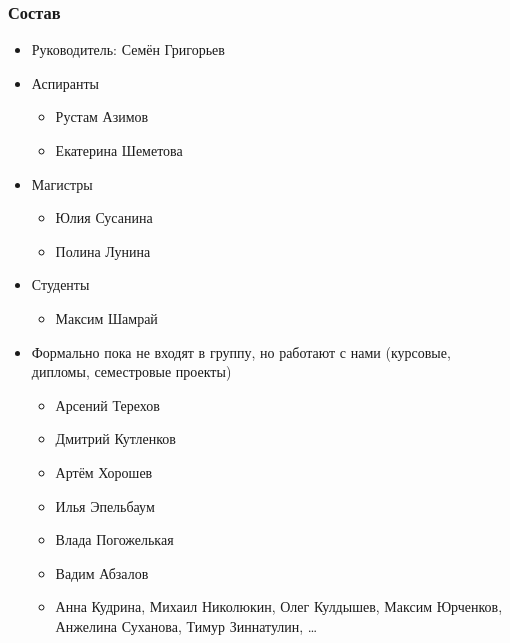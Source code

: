 \documentclass[xcolor=table]{beamer}
\begin{document}
\begin{frame}[fragile]

  \frametitle{Состав}
\begin{itemize}
      \item Руководитель: Семён Григорьев
      \item Аспиранты
      \begin{itemize}
        \item Рустам Азимов
        \item Екатерина Шеметова
      \end{itemize}
      \item Магистры
      \begin{itemize}
        \item Юлия Сусанина
        \item Полина Лунина
      \end{itemize}
      \item Студенты
      \begin{itemize}
        \item Максим Шамрай
      \end{itemize}
      \item Формально пока не входят в группу, но работают с нами (курсовые, дипломы, семестровые проекты)
      \begin{itemize}
        \item Арсений Терехов
        \item Дмитрий Кутленков
        \item Артём Хорошев
        \item Илья Эпельбаум
        \item Влада Погожелькая
        \item Вадим Абзалов
        \item Анна Кудрина, Михаил Николюкин, Олег Кулдышев, Максим Юрченков, Анжелина Суханова, Тимур Зиннатулин, \dots
      \end{itemize}

\end{itemize}

\end{frame}
\end{document}
